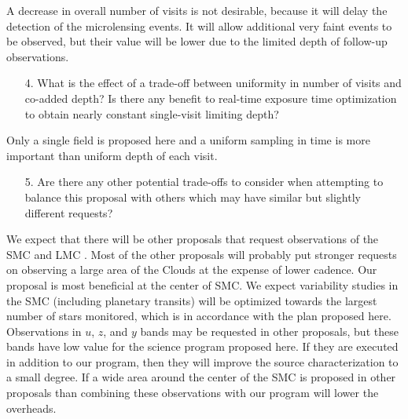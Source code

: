 \documentclass[12pt,letterpaper]{article}
\begin{document}
A decrease in overall number of visits is not desirable, because it will delay 
the detection of the microlensing events.  It will allow additional very faint 
events to be observed, but their value will be lower due to the limited depth of 
follow-up observations. 

\begin{footnotesize}
\begin{enumerate}
    \item[4.] What is the effect of a trade-off between uniformity in number of visits and co-added depth? Is there any benefit to real-time exposure time optimization to obtain nearly constant single-visit limiting depth?
\end{enumerate}
\end{footnotesize}

Only a single field is proposed here and a uniform sampling in time is more 
important than uniform depth of each visit.

\begin{footnotesize}
\begin{enumerate}
    \item[5.] Are there any other potential trade-offs to consider when attempting to balance this proposal with others which may have similar but slightly different requests?
\end{enumerate}
\end{footnotesize}

We expect that there will be other proposals that request observations of the SMC and LMC 
\citep[see Sec.\, 7 in][]{marshall17}.  Most of the other proposals will probably 
put stronger requests on observing a large area of the Clouds at the expense of lower cadence.  
Our proposal is most beneficial at the center of SMC.  We expect variability 
studies in the SMC (including planetary transits) will be optimized towards 
the largest number of stars monitored, which is in accordance with the plan 
proposed here. Observations in $u$, $z$, and $y$ bands may be requested 
in other proposals, but these bands have low value for the science program 
proposed here.  If they are executed in addition to our program, then they 
will improve the source characterization to a small degree.  
If a wide area around the center of the SMC is proposed in other proposals 
than combining these observations with our program will lower the overheads. 
\end{document}
